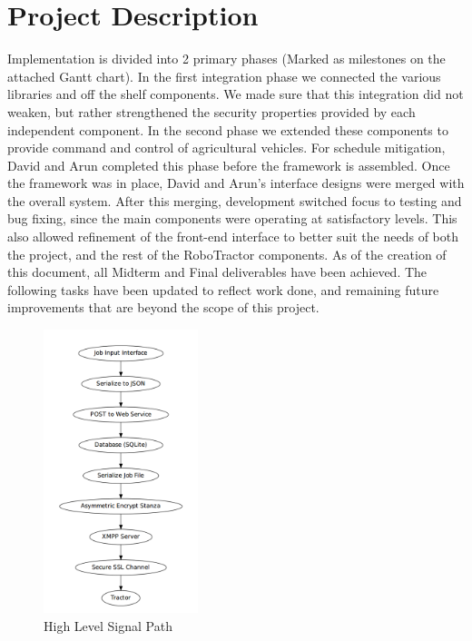 \documentclass[conference,12pt]{IEEEtran}
\begin{document}
\section{Project Description}
\label{sec:proj_desc}
Implementation is divided into 2 primary phases (Marked as milestones on the attached Gantt chart). In the first integration phase we connected the various libraries and off the shelf components. We made sure that this integration did not weaken, but rather strengthened the security properties provided by each independent component.
In the second phase we extended these components to provide command and control of agricultural vehicles. For schedule mitigation, David and Arun completed this phase before the framework is assembled. Once the framework was in place, David and Arun's interface designs were merged with the overall system. After this merging, development switched focus to testing and bug fixing, since the main components were operating at satisfactory levels. This also allowed refinement of the front-end interface to better suit the needs of both the project, and the rest of the RoboTractor components. As of the creation of this document, all Midterm and Final deliverables have been achieved. The following tasks have been updated to reflect work done, and remaining future improvements that are beyond the scope of this project.

\begin{figure}
\centering
\includegraphics[width=0.4\textwidth]{Images/signalpath.png}
\caption{High Level Signal Path}
\label{fig:signalpath}
\end{figure}
\end{document}
